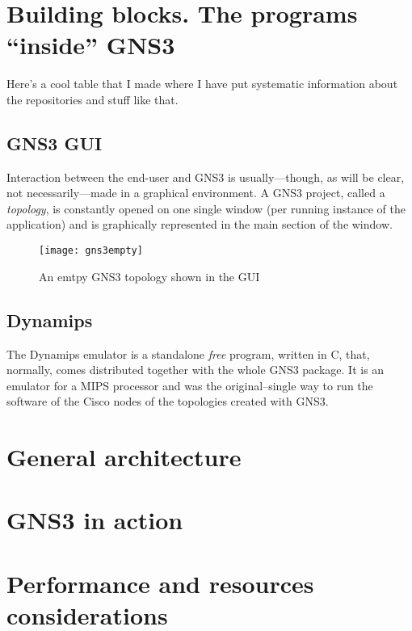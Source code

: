 
\section{Building blocks. The programs ``inside'' GNS3}
\label{sec:gns3buildingblocks}

Here's a cool table that I made where I have put systematic information about the repositories and stuff like that.



\subsection{GNS3 GUI}
\label{subsec:gns3gui}

Interaction between the end-user and GNS3 is usually---though, as will be clear, not necessarily---made in a graphical environment.
A GNS3 project, called a \emph{topology}, is constantly opened on one single window (per running instance of the application) and is graphically represented in the main section of the window.

\begin{figure}
  \centering
  \texttt{[image: gns3empty]}
  \caption{An emtpy GNS3 topology shown in the GUI}
\end{figure}

\subsection{Dynamips}
\label{subsec:gns3dynamips}

The Dynamips emulator is a standalone \emph{free} program, written in C, that, normally, comes distributed together with the whole GNS3 package.
It is an emulator for a MIPS processor and was the original--single way to run the software of the Cisco nodes of the topologies created with GNS3.


\section{General architecture}
\label{sec:gns3architecture}


\section{GNS3 in action}
\label{sec:gns3inaction}


\section{Performance and resources considerations}
\label{sec:gns3performance}


